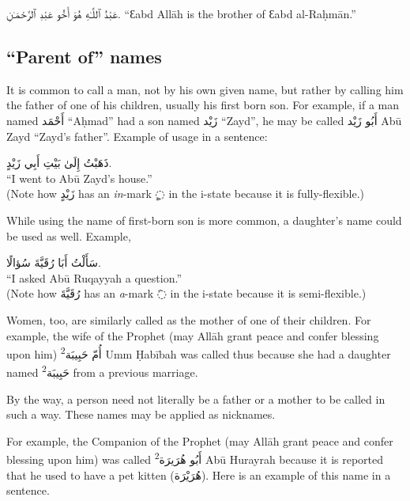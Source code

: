 \documentclass[
  10pt,
]{book}
\begin{document}
\foreignlanguage{arabic}{عَبْدُ ٱللَّـٰهِ هُوَ أَخُو عَبْدِ ٱلرَّحْمَـٰنِ.}
\enquote{Ɛabd Allāh is the brother of Ɛabd al-Raḥmān.}

\subsection{\texorpdfstring{\enquote{Parent of} names}{``Parent of'' names}}\label{parent-of-names}

It is common to call a man, not by his own given name, but rather by calling him the father of one of his children, usually his first born son. For example, if a man named \foreignlanguage{arabic}{أَحْمَد} \enquote{Aḥmad} had a son named \foreignlanguage{arabic}{زَيْد} \enquote{Zayd}, he may be called \foreignlanguage{arabic}{أَبُو زَيْد} Abū Zayd \enquote{Zayd's father}. Example of usage in a sentence:

\foreignlanguage{arabic}{ذَهَبْتُ إِلَىٰ بَيْتِ أَبِي زَيْدٍ.}\\
\enquote{I went to Abū Zayd's house.}\\
(Note how \foreignlanguage{arabic}{زَيْدٍ} has an \emph{in}-mark \foreignlanguage{arabic}{◌ٍ} in the i-state because it is fully-flexible.)

While using the name of first-born son is more common, a daughter's name could be used as well. Example,

\foreignlanguage{arabic}{سَأَلْتُ أَبَا رُقَيَّةَ سُؤالًا.}\\
\enquote{I asked Abū Ruqayyah a question.}\\
(Note how \foreignlanguage{arabic}{رُقَيَّةَ} has an \emph{a}-mark \foreignlanguage{arabic}{◌َ} in the i-state because it is semi-flexible.)

Women, too, are similarly called as the mother of one of their children. For example,
the wife of the Prophet
(may Allāh grant peace and confer blessing upon him)
\textsuperscript{2}\foreignlanguage{arabic}{أُمّ حَبِيبَة} Umm Ḥabībah
was called thus because she had a daughter named
\textsuperscript{2}\foreignlanguage{arabic}{حَبِيبَة}
from a previous marriage.

By the way, a person need not literally be a father or a mother to be called in such a way. These names may be applied as nicknames.

For example, the Companion of the Prophet
(may Allāh grant peace and confer blessing upon him)
was called
\textsuperscript{2}\foreignlanguage{arabic}{أَبُو هُرَيرَة}
Abū Hurayrah
because it is reported that he used to have a pet kitten (\foreignlanguage{arabic}{هُرَيْرَة}). Here is an example of this name in a sentence.
\end{document}
